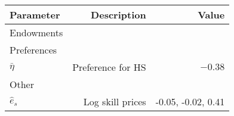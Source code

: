 \begin{tabular}{lrr}
\hline
Parameter & Description  & Value  \\
\hline
Endowments &   &   \\
Preferences &   &   \\
$\bar{\eta}$ & Preference for HS  & $-0.38$  \\
Other &   &   \\
$\hat{e}_{s}$ & Log skill prices  & -0.05, -0.02, 0.41  \\
\hline
\end{tabular}%
